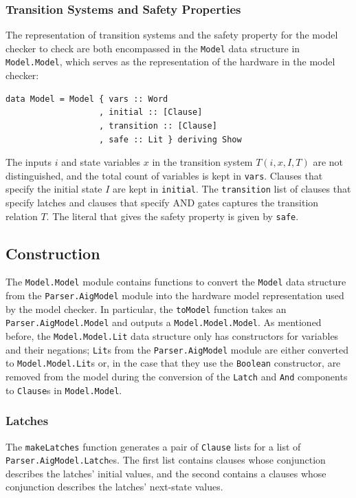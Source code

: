\documentclass[12pt,a4paper,twoside,openright]{report}
\begin{document}
{\subsubsection{Transition Systems and Safety Properties}
The representation of transition systems and the safety property for the model checker to check
are both encompassed in the \verb,Model, data structure in \verb,Model.Model,, which serves
as the representation of the hardware in the model checker:
\begin{lstlisting}
data Model = Model { vars :: Word
                   , initial :: [Clause]
                   , transition :: [Clause]
                   , safe :: Lit } deriving Show
\end{lstlisting}

The inputs $i$ and state variables $x$ in the transition system $T(i,x,I,T)$
are not distinguished, and the total count of variables is kept in \verb,vars,.
Clauses that specify the initial state $I$ are kept in \verb,initial,.
The \verb,transition, list of clauses that specify latches and clauses that specify AND
gates captures the transition relation $T$.
The literal that gives the safety property is given by \verb,safe,.

\subsection{Construction}

The \verb,Model.Model, module contains functions to convert the \verb,Model, data
structure from the \verb,Parser.AigModel, module into the hardware model representation used by
the model checker. In particular, the \verb,toModel, function takes an \verb,Parser.AigModel.Model,
and outputs a \verb,Model.Model.Model,. As mentioned before, the \verb,Model.Model.Lit,
data structure only has constructors for variables and their negations; \verb,Lit,s from
the \verb,Parser.AigModel, module are either converted to \verb,Model.Model.Lit,s or, in the case
that they use the \verb,Boolean, constructor, are removed from the model during the conversion of
the \verb,Latch, and \verb,And, components to \verb,Clause,s in \verb,Model.Model,.

\subsubsection{Latches}
The \verb,makeLatches, function generates a pair of \verb,Clause, lists
for a list of \verb,Parser.AigModel.Latch,es. The first list contains
clauses whose conjunction describes the latches' initial values,
and the second contains a clauses whose conjunction describes the
latches' next-state values.

}
\end{document}
